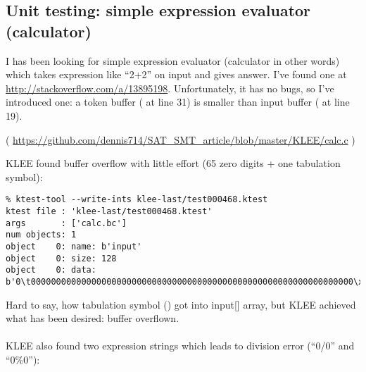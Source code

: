 \subsection{Unit testing: simple expression evaluator (calculator)}

I has been looking for simple expression evaluator (calculator in other words) which takes expression like ``2+2'' on input and gives answer.
I've found one at \url{http://stackoverflow.com/a/13895198}.
Unfortunately, it has no bugs, so I've introduced one: a token buffer ( at line 31) is smaller than input buffer ( at line 19).


( \url{https://github.com/dennis714/SAT_SMT_article/blob/master/KLEE/calc.c} )

KLEE found buffer overflow with little effort (65 zero digits + one tabulation symbol):

\begin{lstlisting}
% ktest-tool --write-ints klee-last/test000468.ktest
ktest file : 'klee-last/test000468.ktest'
args       : ['calc.bc']
num objects: 1
object    0: name: b'input'
object    0: size: 128
object    0: data: b'0\t0000000000000000000000000000000000000000000000000000000000000000\xff\xff\xff\xff\xff\xff\xff\xff\xff\xff\xff\xff\xff\xff\xff\xff\xff\xff\xff\xff\xff\xff\xff\xff\xff\xff\xff\xff\xff\xff\xff\xff\xff\xff\xff\xff\xff\xff\xff\xff\xff\xff\xff\xff\xff\xff\xff\xff\xff\xff\xff\xff\xff\xff\xff\xff\xff\xff\xff\xff\xff\xff'
\end{lstlisting}

Hard to say, how tabulation symbol () got into input[] array, but KLEE achieved what has been desired: buffer overflown.\\
\\
KLEE also found two expression strings which leads to division error (``0/0'' and ``0\%0''):

